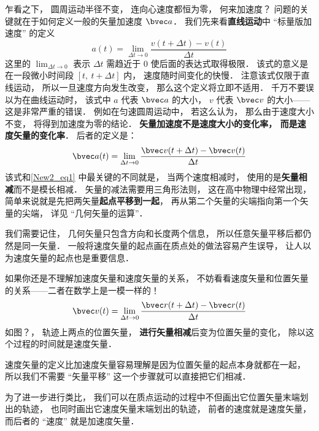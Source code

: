 乍看之下， 圆周运动半径不变， 连向心速度都恒为零， 何来加速度？ 问题的关键就在于如何定义一般的矢量加速度 $\bvec a$． 我们先来看\textbf{直线运动}中 “标量版加速度” 的定义
\begin{equation}\label{New2_eq1}
a(t) = \lim_{\Delta t\to 0}\frac{v(t+\Delta t) - v(t)}{\Delta t}
\end{equation}
这里的 $\lim_{\Delta t\to 0}$ 表示 $\Delta t$ 需趋近于 0 使后面的表达式取得极限． 该式的意义是在一段微小时间段 $[t,\ t+\Delta t]$ 内， 速度随时间变化的快慢． 注意该式仅限于直线运动， 所以一旦速度方向发生改变， 那么这个定义将立即不适用． 千万不要误以为在曲线运动时， 该式中 $a$ 代表 $\bvec a$ 的大小， $v$ 代表 $\bvec v$ 的大小——这是非常严重的错误． 例如在匀速圆周运动中， 若这么认为， 那么由于速度大小不变， 将得到加速度为零的结论． \textbf{矢量加速度不是速度大小的变化率， 而是速度矢量的变化率}． 后者的定义是：
\begin{equation}\label{New2_eq2}
\bvec a(t) = \lim_{\Delta t\to 0}\frac{\bvec v(t+\Delta t) - \bvec v(t)}{\Delta t}
\end{equation}
该式和\autoref{New2_eq1} 中最关键的不同就是， 当两个速度相减时， 使用的是\textbf{矢量相减}而不是模长相减． 矢量的减法需要用三角形法则， 这在高中物理中经常出现， 简单来说就是先把两矢量\textbf{起点平移到一起}， 再从第二个矢量的尖端指向第一个矢量的尖端， 详见 “几何矢量的运算”．


我们需要记住， 几何矢量只包含方向和长度两个信息， 所以任意矢量平移后都仍然是同一矢量． 一般将速度矢量的起点画在质点处的做法容易产生误导， 让人以为速度矢量的起点也是重要信息．

如果你还是不理解加速度矢量和速度矢量的关系， 不妨看看速度矢量和位置矢量的关系——二者在数学上是一模一样的！
\begin{equation}
\bvec v(t) = \lim_{\Delta t\to 0}\frac{\bvec r(t+\Delta t) - \bvec r(t)}{\Delta t}
\end{equation}
如图？， 轨迹上两点的位置矢量， \textbf{进行矢量相减}后变为位置矢量的变化， 除以这个过程的时间就是速度矢量．

速度矢量的定义比加速度矢量容易理解是因为位置矢量的起点本身就都在一起， 所以我们不需要 “矢量平移” 这一个步骤就可以直接把它们相减．

为了进一步进行类比， 我们可以在质点运动的过程中不但画出它位置矢量末端划出的轨迹， 也同时画出它速度矢量末端划出的轨迹， 前者的速度就是速度矢量， 而后者的 “速度” 就是加速度矢量．

